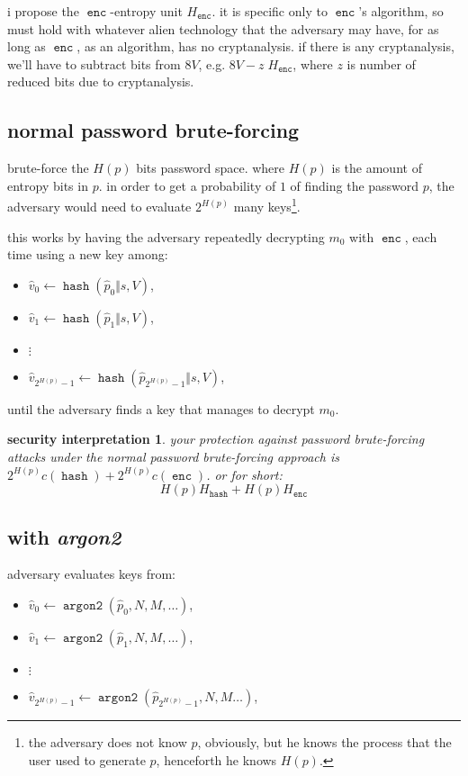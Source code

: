 \documentclass[twocolumn]{article}
\newtheorem{security}{security interpretation}
\DeclareMathOperator{\enc}{\texttt{enc}}
\DeclareMathOperator{\hash}{\texttt{hash}}
\DeclareMathOperator{\argon}{\texttt{argon2}}
\begin{document}
i propose the $\enc$-entropy unit $H_{\enc}$.  it is specific only to
$\enc$'s algorithm, so must hold with whatever alien technology that the
adversary may have, for as long as $\enc$, as an algorithm, has no
cryptanalysis.  if there is any cryptanalysis, we'll have to subtract bits
from $8V$, e.g. $8V - z \; H_{\enc}$, where $z$ is number of reduced bits
due to cryptanalysis.

\subsection{normal password brute-forcing}
brute-force the $H(p)$ bits password space.  where $H(p)$ is the amount of
entropy bits in $p$.  in order to get a probability of $1$ of finding the
password $p$, the adversary would need to evaluate $2^{H(p)}$ many
keys\footnote{the adversary does not know $p$, obviously, but he knows the
process that the user used to generate $p$, henceforth he knows $H(p)$.}.

this works by having the adversary repeatedly decrypting $m_0$ with $\enc$,
each time using a new key among:
\begin{itemize}
    \item $\hat v_0 \gets \hash(\hat p_0 \Vert s, V)$,
    \item $\hat v_1 \gets \hash(\hat p_1 \Vert s, V)$,
    \item $\vdots$
    \item $\hat v_{2^{H(p)}-1} \gets \hash(\hat p_{2^{H(p)}-1} \Vert s,
    V)$,
\end{itemize}
until the adversary finds a key that manages to decrypt $m_0$.

\begin{security}
your protection against password brute-forcing attacks under the normal
password brute-forcing approach is $2^{H(p)} c(\hash) + 2^{H(p)} c(\enc)$.
or for short:
\[
    H(p) H_{\hash} + H(p) H_{\enc}
\]
\end{security}

\subsection{with \emph{argon2}}
adversary evaluates keys from:
    \begin{itemize}
        \item $\hat v_0 \gets \argon(\hat p_0, N, M, \ldots)$,
        \item $\hat v_1 \gets \argon(\hat p_1, N, M, \ldots)$,
        \item $\vdots$
        \item $\hat v_{2^{H(p)}-1} \gets \argon(\hat p_{2^{H(p)}-1}, N, M
        \ldots)$,
    \end{itemize}
\end{document}
